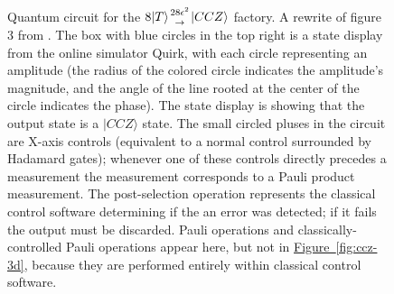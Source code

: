\documentclass[twocolumn,accepted=2019-03-30]{quantumarticle}
\newcommand{\fig}[1]{\hyperref[fig:#1]{Figure~\ref*{fig:#1}}}
\newcommand{\factory}[3]{$#1 \genfrac{}{}{0pt}{}{#2}{\rightarrow} {#3}$ factory}
\begin{document}
\begin{figure}
  \label{fig:ccz-circuit}
  \caption{
    Quantum circuit for the \factory{8|T\rangle}{28\epsilon^2}{|CCZ\rangle}.
    A rewrite of figure 3 from \cite{jones2013}.
    The box with blue circles in the top right is a state display from the online simulator Quirk, with each circle representing an amplitude (the radius of the colored circle indicates the amplitude's magnitude, and the angle of the line rooted at the center of the circle indicates the phase).
    The state display is showing that the output state is a $|CCZ\rangle$ state.
    The small circled pluses in the circuit are X-axis controls (equivalent to a normal control surrounded by Hadamard gates); whenever one of these controls directly precedes a measurement the measurement corresponds to a Pauli product measurement.
    The post-selection operation represents the classical control software determining if the an error was detected; if it fails the output must be discarded.
    Pauli operations and classically-controlled Pauli operations appear here, but not in \fig{ccz-3d}, because they are performed entirely within classical control software.
}
\end{figure}
\end{document}
